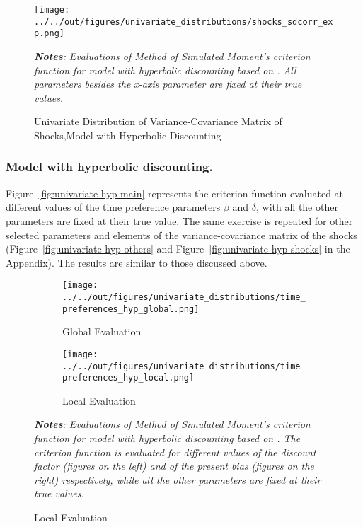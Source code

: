 \begin{figure} 
\centering
\captionsetup{justification=centering}
\caption{Univariate Distribution of Variance-Covariance Matrix of Shocks,\newline Model with Hyperbolic Discounting}
\label{fig:univariate-exp-shocks}
\texttt{[image: ../../out/figures/univariate\_distributions/shocks\_sdcorr\_exp.png]}

\bigskip
\footnotesize
\raggedright
\textit{\textbf{Notes}: Evaluations of Method of Simulated Moment's criterion function for model with hyperbolic discounting based on \textcite{KeaneWolpin1994}. All parameters besides the x-axis parameter are fixed at their true values.}
\end{figure}

\subsubsection{Model with hyperbolic discounting.} Figure~\ref{fig:univariate-hyp-main} represents the criterion function evaluated at different values of the time preference parameters $\beta$ and $\delta$, with all the other parameters are fixed at their true value. The same exercise is repeated for other selected parameters and elements of the variance-covariance matrix of the shocks (Figure~\ref{fig:univariate-hyp-others} and Figure~\ref{fig:univariate-hyp-shocks} in the Appendix). The results are similar to those discussed above.

\begin{figure}[!t]
\centering
\captionsetup{justification=centering}
\caption{Univariate Distribution of Time Preference Parameters,\newline Model with Hyperbolic Discounting}
\label{fig:univariate-hyp-main}
\begin{subfigure}{\textwidth}
\caption{Global Evaluation}
\texttt{[image: ../../out/figures/univariate\_distributions/time\_preferences\_hyp\_global.png]}
\end{subfigure}
\begin{subfigure}{\textwidth} 
\caption{Local Evaluation}
\texttt{[image: ../../out/figures/univariate\_distributions/time\_preferences\_hyp\_local.png]}
\end{subfigure}

\bigskip
\footnotesize
\raggedright
\textit{\textbf{Notes}: Evaluations of Method of Simulated Moment's criterion function for model with hyperbolic discounting based on \textcite{KeaneWolpin1994}. The criterion function is evaluated for different values of the discount factor (figures on the left) 
and of the present bias (figures on the right) respectively, while all the other parameters are fixed at their true values.}
\end{figure}

